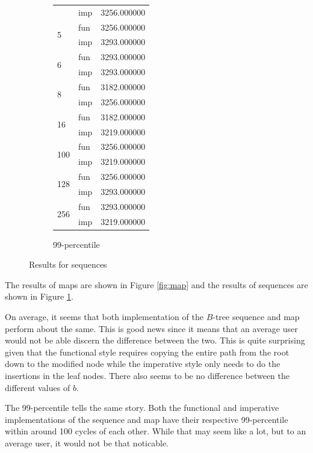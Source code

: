 \documentclass{article}
\begin{document}
\begin{figure}
\begin{subfigure}[b]{0.3\textwidth}
\begin{tabular}{llr}
             & imp & 3256.000000 \\
            \multirow[c]{2}{*}{5} & fun & 3256.000000 \\
             & imp & 3293.000000 \\
            \multirow[c]{2}{*}{6} & fun & 3293.000000 \\
             & imp & 3293.000000 \\
            \multirow[c]{2}{*}{8} & fun & 3182.000000 \\
             & imp & 3256.000000 \\
            \multirow[c]{2}{*}{16} & fun & 3182.000000 \\
             & imp & 3219.000000 \\
            \multirow[c]{2}{*}{100} & fun & 3256.000000 \\
             & imp & 3219.000000 \\
            \multirow[c]{2}{*}{128} & fun & 3256.000000 \\
             & imp & 3293.000000 \\
            \multirow[c]{2}{*}{256} & fun & 3293.000000 \\
             & imp & 3219.000000 \\
        \end{tabular}
        \caption{99-percentile}
    \end{subfigure}
    \caption{Results for sequences}
    \label{fig:sequence}
\end{figure}

The results of maps are shown in Figure \ref{fig:map} and the results of sequences are shown in
Figure \ref{fig:sequence}.

On average, it seems that both implementation of the $B$-tree sequence and map perform 
about the same. This is good news since it means that an average
user would not be able discern the difference between the two. This is quite surprising given that
the functional style requires copying the entire path from the root down to the modified node
while the imperative style only needs to do the insertions in the leaf nodes. There also seems
to be no difference between the different values of $b$.

The 99-percentile tells the same story. Both the functional and imperative implementations of the
sequence and map have their respective 99-percentile within around 100 cycles of each other. While
that may seem like a lot, but to an average user, it would not be that noticable.
\end{document}
